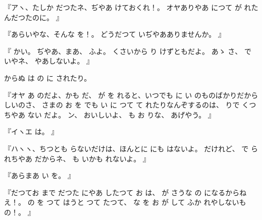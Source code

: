 『アヽ、たしか
だつたネ、ぢやあ
けておくれ！。
オヤありやあ
につて
が
れたんだつたのに。
』

『あらいやな、そんな
を！。
どうだつて
いぢやあありませんか。
』

『
かい。
ぢやあ、まあ、
ふよ。
くさいから
り
けずともだよ。
あゝ
さ、
で
いやネ、
やあしないよ。
』

からぬ
は
の
に
されたり。

『オヤ
あ
のだよ、かも
だ、
が
を
れると、いつでも
に
い
のものばかりだから
しいのさ、
さまの
お
を
でも
い
に
つて
て
れたりなんぞするのは、
りで
くつちやあ
ない
だよ。
ン、
おいしいよ、
も
お
りな、
あげやう。
』

『イヽエ
は。
』

『ハヽヽ、ちつとも
らないだけは、ほんとに
にも
はないよ。
だけれど、
で
られちやあ
だからネ、
も
いかも
れないよ。
』

『あらまあ
い
を。
』

『だつてお
まで
だつた
にやあ
したつて
お
は、
が
さうな
の
になるからねえ！。
の
を
つて
はうと
つて
たつて、
な
を
お
が
して
ふか
れやしないもの！。
』

